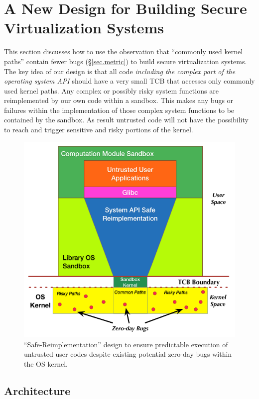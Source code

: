 \section{A New Design for Building Secure Virtualization Systems}
\label{sec.design}

This section discusses how to use the observation
 that ``commonly used kernel paths'' contain fewer bugs 
(\S{\ref{sec.metric}}) to build secure virtualization systems.
The key idea of our design is that all code \emph{including the complex part
of the operating system API} should have a very small TCB that accesses only 
commonly used kernel paths. 
Any complex or possibly risky system functions 
are reimplemented by our own code within a sandbox. This makes any bugs or failures within the implementation of those complex system functions 
to be contained by the sandbox. As result untrusted code will not have the possibility to reach 
and trigger sensitive and risky portions of the kernel. 


\begin{figure}%
\centering
\includegraphics[width=1.0\columnwidth]{diagram/lind_secure_design_new.png}
\caption{``Safe-Reimplementation'' design to ensure predictable execution of untrusted user codes despite existing potential zero-day bugs within the OS kernel.} 
\label{fig:design}
\end{figure}

\subsection{Architecture}

